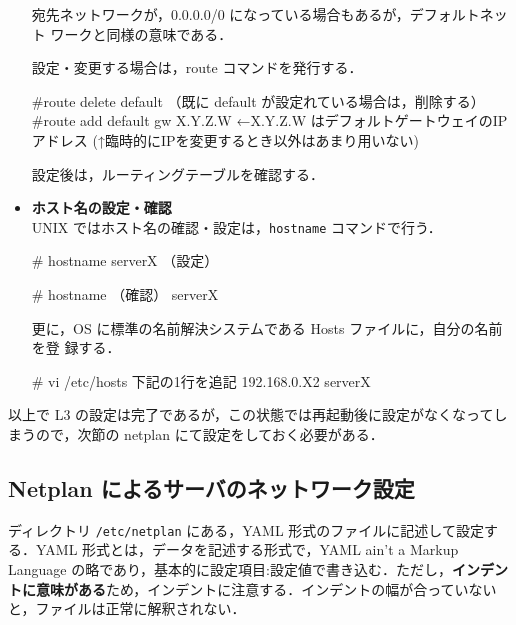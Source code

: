 \begin{itemize}
宛先ネットワークが，0.0.0.0/0 になっている場合もあるが，デフォルトネット
     ワークと同様の意味である．

設定・変更する場合は，route コマンドを発行する．
\begin{cli}
#route delete default （既に default が設定れている場合は，削除する）
#route add default gw X.Y.Z.W  ←X.Y.Z.W はデフォルトゲートウェイのIPアドレス
(↑臨時的にIPを変更するとき以外はあまり用いない)
\end{cli}

設定後は，ルーティングテーブルを確認する．

\item{\bf ホスト名の設定・確認}\\
UNIX ではホスト名の確認・設定は，\texttt{hostname} コマンドで行う．
\begin{cli}
# hostname serverX  （設定）
\end{cli}
\begin{cli}
# hostname  （確認）
serverX
\end{cli}

更に，OS に標準の名前解決システムである Hosts ファイルに，自分の名前を登
録する．

\begin{cli}
# vi /etc/hosts
 下記の1行を追記
192.168.0.X2            serverX

\end{cli}

\end{itemize}

以上で L3 の設定は完了であるが，この状態では再起動後に設定がなくなってし
まうので，次節の netplan にて設定をしておく必要がある．

\subsection{Netplan によるサーバのネットワーク設定}

ディレクトリ \texttt{/etc/netplan} にある，YAML 形式のファイルに記述して設定する．YAML 形式とは，データを記述する形式で，YAML ain't a Markup Language の略であり，基本的に設定項目:設定値で書き込む．ただし，\textbf{インデントに意味がある}ため，インデントに注意する．インデントの幅が合っていないと，ファイルは正常に解釈されない．


